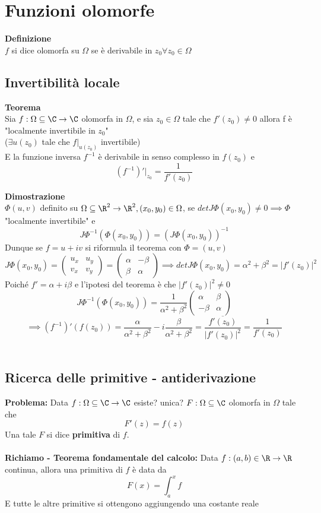 

\section{Funzioni olomorfe}
\begin{tcolorbox}
	\textbf{Definizione} \\
	$f$ si dice olomorfa su $\Omega$ se è derivabile in $z_0\forall z_0\in\Omega$
\end{tcolorbox}
\subsection{Invertibilità locale}
\begin{tcolorbox}
\textbf{Teorema}
\\Sia $f:\Omega \subseteq\C\to \C$ olomorfa in $\Omega$, e sia $z_0\in\Omega$ tale che $f'(z_0)\ne0$ allora f è "localmente invertibile in $z_0$"\\
($\exists u(z_0)$ tale che $f|_{u(z_0)}$ invertibile)
\\E la funzione inversa $f^{-1}$ è derivabile in senso complesso in $f(z_0)$ e 
\[(f^{-1})'|_{z_0}=\frac{1}{f'(z_0)}\]	
\end{tcolorbox}
\textbf{Dimostrazione}\\
$\Phi(u,v)$ definito su $\Omega \subseteq \R^2\to \R^2, (x_0,y_0)\in\Omega$, se $detJ\Phi(x_0,y_0)\ne 0\implies\Phi$ "localmente invertibile" e 
\[J\Phi^{-1}(\Phi(x_0,y_0))=(J\Phi(x_0,y_0))^{-1}\]
Dunque se $f=u+iv$ si riformula il teorema con $\Phi=(u,v)$
\[J\Phi(x_0,y_0)=\begin{pmatrix}
	u_x&u_y\\v_x & v_y
\end{pmatrix}
=\begin{pmatrix}
	\alpha & -\beta \\ \beta & \alpha
\end{pmatrix}
\implies detJ\Phi(x_0,y_0)=\alpha^2+\beta^2=|f'(z_0)|^{2}
\]
Poiché $f'=\alpha +i\beta$ e l'ipotesi del teorema è che $|f'(z_0)|^2\ne 0$
\[J\Phi^{-1}(\Phi(x_0,y_0))=\frac{1}{\alpha^2+\beta^2}\begin{pmatrix}
	\alpha&\beta\\-\beta &\alpha
\end{pmatrix}
\]
\[\implies(f^{-1})'(f(z_0))=\frac{\alpha}{\alpha^2+\beta^2}-i\frac{\beta}{\alpha^2+\beta^2}= \frac{\overline{f'(z_0)}}{|f'(z_0)|^2}=\frac{1}{f'(z_0)}\]
\\
\subsection{Ricerca delle primitive - antiderivazione}
\textbf{Problema: }Data $f:\Omega \subseteq \C\to \C$ esiste? unica? $F:\Omega\subseteq\C$ olomorfa in $\Omega$ tale che \[F'(z)=f(z)\]
Una tale $F$ si dice \textbf{primitiva} di $f$.\\
\\\textbf{Richiamo - Teorema fondamentale del calcolo: }Data $f:(a,b)\in\R\to \R$ continua, allora una primitiva di $f$ è data da \[F(x)=\int_{a}^{x} f\]
E tutte le altre primitive si ottengono aggiungendo una costante reale

